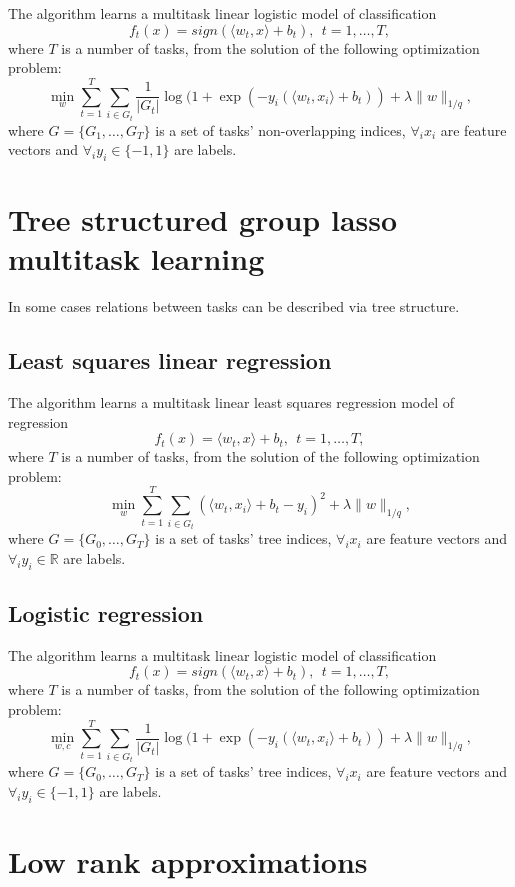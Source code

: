 The algorithm learns a multitask linear logistic model of classification 
$$
f_t(x) = sign (\langle w_t,x \rangle + b_t), ~~ t = 1, \dots, T,
$$
where $T$ is a number of tasks, from the solution of the following optimization problem:
$$
\min_w \sum_{t=1}^{T} \sum_{i \in G_t} \frac{1}{|G_t|} \log (1+\exp\left(-y_i(\langle w_t,x_i \rangle + b_t)\right)
+ \lambda \| w \|_{1/q},
$$
where $G = \{ G_1, \dots, G_T \}$ is a set of tasks' non-overlapping indices, $\forall_i x_i$ are feature 
vectors and $\forall_i y_i \in \{-1,1\}$ are labels.

\section{Tree structured group lasso multitask learning}

In some cases relations between tasks can be described via tree structure. 

\subsection{Least squares linear regression}

The algorithm learns a multitask linear least squares regression model of regression 
$$
f_t(x) = \langle w_t,x \rangle + b_t, ~~ t = 1, \dots, T,
$$
where $T$ is a number of tasks, from the solution of the following optimization problem:
$$
\min_w \sum_{t=1}^{T} \sum_{i \in G_t} \left(\langle w_t,x_i \rangle + b_t - y_i\right)^2
+ \lambda \| w \|_{1/q},
$$
where $G = \{ G_0, \dots, G_T \}$ is a set of tasks' tree indices, $\forall_i x_i$ are feature 
vectors and $\forall_i y_i \in \mathbb{R}$ are labels.

\subsection{Logistic regression}

The algorithm learns a multitask linear logistic model of classification 
$$
f_t(x) = sign (\langle w_t,x \rangle + b_t), ~~ t = 1, \dots, T,
$$
where $T$ is a number of tasks, from the solution of the following optimization problem:
$$
\min_{w,c} \sum_{t=1}^{T} \sum_{i \in G_t} \frac{1}{|G_t|} \log (1+\exp\left(-y_i(\langle w_t,x_i \rangle + b_t)\right)
+ \lambda \| w \|_{1/q},
$$
where $G = \{ G_0, \dots, G_T \}$ is a set of tasks' tree indices, $\forall_i x_i$ are feature 
vectors and $\forall_i y_i \in \{-1,1\}$ are labels.

\section{Low rank approximations}

